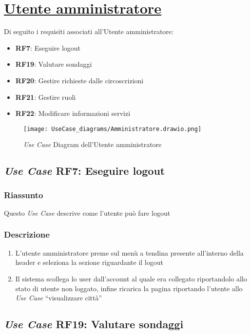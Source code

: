 \section{\texorpdfstring{\underline{Utente amministratore}}{Utente amministratore}}
    Di seguito i requisiti associati all'Utente amministratore:
    \begin{itemize}
        \item \textbf{RF7}: Eseguire logout
        \item \textbf{RF19}: Valutare sondaggi
        \item \textbf{RF20}: Gestire richieste dalle circoscrizioni
        \item \textbf{RF21}: Gestire ruoli
        \item \textbf{RF22}: Modificare informazioni servizi
    \end{itemize}
    \begin{figure}[H]
        \centering
        \texttt{[image: UseCase\_diagrams/Amministratore.drawio.png]}
        \caption{\textit{Use Case} Diagram dell'Utente amministratore}
    \end{figure}

    \subsection{\textit{Use Case} RF7: Eseguire logout}
        \subsubsection{Riassunto}
            Questo \textit{Use Case} descrive come l'utente può fare logout
        \subsubsection{Descrizione}
            \begin{enumerate}
                \item L'utente amministratore preme sul menù a tendina presente all'interno della header e seleziona la sezione riguardante il logout
                \item Il sistema scollega lo user dall'account al quale era collegato riportandolo allo stato di utente non loggato, infine 
                ricarica la pagina riportando l'utente allo \textit{Use Case} ``visualizzare città''
            \end{enumerate}

    \subsection{\textit{Use Case} RF19: Valutare sondaggi}
